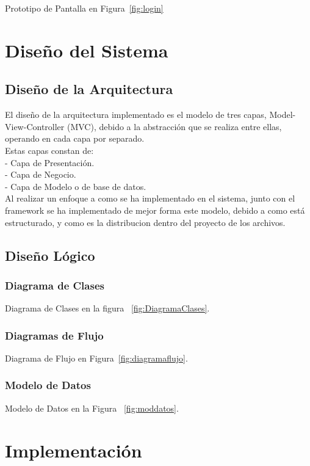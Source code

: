 \documentclass[12pt]{article}
\begin{document}
Prototipo de Pantalla en Figura~\ref{fig:login}

\newpage
\section{Dise\~no del Sistema}
\subsection{Dise\~no de la Arquitectura}
El dise\~no de la arquitectura implementado es el modelo de tres capas, Model-View-Controller (MVC), debido a la abstracción que se realiza entre ellas, operando en cada capa por separado.\\
Estas capas constan de:\\
-	Capa de Presentación.\\
-	Capa de Negocio.\\
-	Capa de Modelo o de base de datos.\\

Al realizar un enfoque a como se ha implementado en el sistema, junto con el framework se ha implementado de mejor 
forma este modelo, debido a como está estructurado, y como es la distribucion dentro del proyecto de los archivos.

\subsection{Dise\~no Lógico}
\subsubsection{Diagrama de Clases}
Diagrama de Clases en la figura ~\ref{fig:DiagramaClases}.

\subsubsection{Diagramas de Flujo}
Diagrama de Flujo en Figura~\ref{fig:diagramaflujo}.

\subsubsection{Modelo de Datos}
Modelo de Datos en la Figura ~\ref{fig:moddatos}.



\newpage
\section{Implementación}
\end{document}
